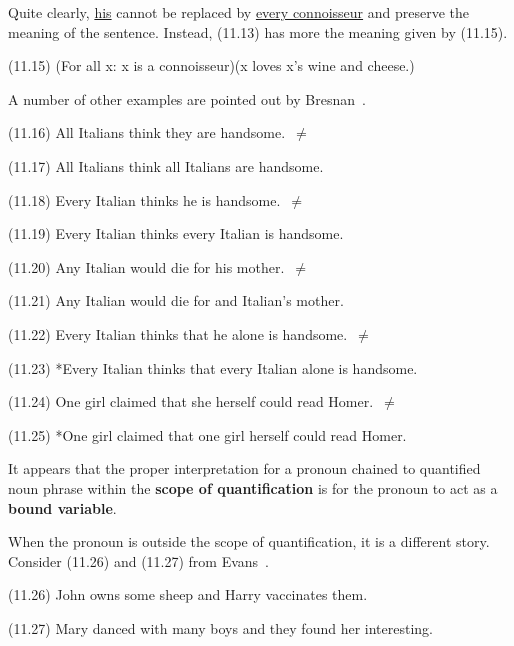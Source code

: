 \documentclass{article}
\begin{document}
Quite clearly, \underline{his} cannot be replaced by
\underline{every connoisseur} and preserve the meaning of the
sentence.  Instead, (11.13) has more the meaning given by
(11.15).

\begin{enumerate*}
\item[(11.15)] (For all x: x is a connoisseur)(x loves x's wine
and cheese.)
\end{enumerate*}

A number of other examples are pointed out by
Bresnan~\cite{Bresnan71}.

\begin{enumerate*}
\item[(11.16)] All Italians think they are handsome.~${\ne}$
\item[(11.17)] All Italians think all Italians are handsome.
\item[(11.18)] Every Italian thinks he is handsome.~${\ne}$
\item[(11.19)] Every Italian thinks every Italian is handsome.
\item[(11.20)] Any Italian would die for his mother.~${\ne}$
\item[(11.21)] Any Italian would die for and Italian's mother.
\item[(11.22)] Every Italian thinks that he alone is
handsome.~${\ne}$
\item[(11.23)] *Every Italian thinks that every Italian alone
is handsome.
\item[(11.24)] One girl claimed that she herself could read
Homer.~${\ne}$
\item[(11.25)] *One girl claimed that one girl herself could
read Homer.
\end{enumerate*}

It appears that the proper interpretation for a pronoun chained
to quantified noun phrase within the
\textbf{scope of quantification} is for the pronoun to act as a
\textbf{bound variable}.

When the pronoun is outside the scope of quantification, it is a
different story. Consider (11.26) and (11.27) from
Evans~\cite{Evans77}.

\begin{enumerate*}
\item[(11.26)] John owns some sheep and Harry vaccinates them.
\item[(11.27)] Mary danced with many boys and they found her
interesting.
\end{enumerate*}
\end{document}
